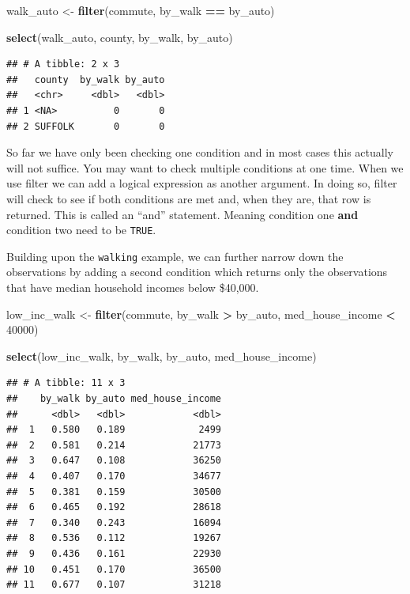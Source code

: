 \documentclass[
]{book}
\newenvironment{Shaded}{\begin{snugshade}}{\end{snugshade}}
\newcommand{\DecValTok}[1]{\textcolor[rgb]{0.00,0.00,0.81}{#1}}
\newcommand{\KeywordTok}[1]{\textcolor[rgb]{0.13,0.29,0.53}{\textbf{#1}}}
\newcommand{\NormalTok}[1]{#1}
\newcommand{\OperatorTok}[1]{\textcolor[rgb]{0.81,0.36,0.00}{\textbf{#1}}}
\newcommand{\StringTok}[1]{\textcolor[rgb]{0.31,0.60,0.02}{#1}}
\begin{document}
\begin{Shaded}
\begin{Highlighting}[]
\NormalTok{walk\_auto \textless{}{-}}\StringTok{ }\KeywordTok{filter}\NormalTok{(commute, by\_walk }\OperatorTok{==}\StringTok{ }\NormalTok{by\_auto)}

\KeywordTok{select}\NormalTok{(walk\_auto, county, by\_walk, by\_auto)}
\end{Highlighting}
\end{Shaded}

\begin{verbatim}
## # A tibble: 2 x 3
##   county  by_walk by_auto
##   <chr>     <dbl>   <dbl>
## 1 <NA>          0       0
## 2 SUFFOLK       0       0
\end{verbatim}

So far we have only been checking one condition and in most cases this actually will not suffice. You may want to check multiple conditions at one time. When we use filter we can add a logical expression as another argument. In doing so, filter will check to see if both conditions are met and, when they are, that row is returned. This is called an ``and'' statement. Meaning condition one \textbf{and} condition two need to be \texttt{TRUE}.

Building upon the \texttt{walking} example, we can further narrow down the observations by adding a second condition which returns only the observations that have median household incomes below \$40,000.

\begin{Shaded}
\begin{Highlighting}[]
\NormalTok{low\_inc\_walk \textless{}{-}}\StringTok{ }\KeywordTok{filter}\NormalTok{(commute, }
\NormalTok{                       by\_walk }\OperatorTok{\textgreater{}}\StringTok{ }\NormalTok{by\_auto,}
\NormalTok{                       med\_house\_income }\OperatorTok{\textless{}}\StringTok{ }\DecValTok{40000}\NormalTok{)}

\KeywordTok{select}\NormalTok{(low\_inc\_walk, by\_walk, by\_auto, med\_house\_income)}
\end{Highlighting}
\end{Shaded}

\begin{verbatim}
## # A tibble: 11 x 3
##    by_walk by_auto med_house_income
##      <dbl>   <dbl>            <dbl>
##  1   0.580   0.189             2499
##  2   0.581   0.214            21773
##  3   0.647   0.108            36250
##  4   0.407   0.170            34677
##  5   0.381   0.159            30500
##  6   0.465   0.192            28618
##  7   0.340   0.243            16094
##  8   0.536   0.112            19267
##  9   0.436   0.161            22930
## 10   0.451   0.170            36500
## 11   0.677   0.107            31218
\end{verbatim}
\end{document}
